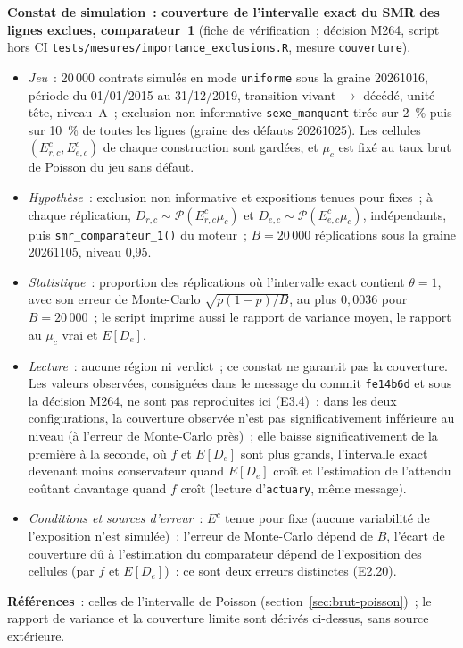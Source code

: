\documentclass[a4paper,11pt]{article}
\newcommand{\code}[1]{\texttt{\small #1}}
\begin{document}
{\medskip
\noindent
\textbf{Constat de simulation~: couverture de l'intervalle exact du SMR des
lignes exclues, comparateur~1} (fiche de vérification~; décision M264,
script hors CI \code{tests/mesures/importance\_exclusions.R}, mesure
\code{couverture}).
\begin{itemize}[leftmargin=*, itemsep=2pt]
  \item \emph{Jeu}~: 20\,000 contrats simulés en mode \code{uniforme} sous
    la graine 20261016, période du 01/01/2015 au 31/12/2019, transition
    vivant $\to$ décédé, unité tête, niveau~A~; exclusion non informative
    \code{sexe\_manquant} tirée sur 2~\% puis sur 10~\% de toutes les lignes
    (graine des défauts 20261025). Les cellules $(E^c_{r,c}, E^c_{e,c})$ de
    chaque construction sont gardées, et $\mu_c$ est fixé au taux brut de
    Poisson du jeu sans défaut.
  \item \emph{Hypothèse}~: exclusion non informative et expositions tenues
    pour fixes~; à chaque réplication, $D_{r,c} \sim
    \mathcal{P}(E^c_{r,c}\mu_c)$ et $D_{e,c} \sim
    \mathcal{P}(E^c_{e,c}\mu_c)$, indépendants, puis
    \code{smr\_comparateur\_1()} du moteur~; $B = 20\,000$ réplications sous
    la graine 20261105, niveau 0,95.
  \item \emph{Statistique}~: proportion des réplications où l'intervalle
    exact contient $\theta = 1$, avec son erreur de Monte-Carlo
    $\sqrt{p(1 - p)/B}$, au plus $0{,}0036$ pour $B = 20\,000$~; le script
    imprime aussi le rapport de variance moyen, le rapport au $\mu_c$ vrai
    et $E[D_e]$.
  \item \emph{Lecture}~: aucune région ni verdict~; ce constat ne garantit
    pas la couverture. Les valeurs observées, consignées dans le message du
    commit \code{fe14b6d} et sous la décision M264, ne sont pas reproduites
    ici (E3.4)~: dans les deux configurations, la couverture observée n'est
    pas significativement inférieure au niveau (à l'erreur de Monte-Carlo
    près)~; elle baisse significativement de la première à la seconde,
    où $f$ et $E[D_e]$ sont plus grands, l'intervalle exact devenant moins
    conservateur quand $E[D_e]$ croît et l'estimation de l'attendu coûtant
    davantage quand $f$ croît (lecture d'\code{actuary}, même message).
  \item \emph{Conditions et sources d'erreur}~: $E^c$ tenue pour fixe
    (aucune variabilité de l'exposition n'est simulée)~; l'erreur de
    Monte-Carlo dépend de $B$, l'écart de couverture dû à l'estimation du
    comparateur dépend de l'exposition des cellules (par $f$ et
    $E[D_e]$)~: ce sont deux erreurs distinctes (E2.20).
\end{itemize}

\noindent
\textbf{Références}~: celles de l'intervalle de Poisson
(section~\ref{sec:brut-poisson})~; le rapport de variance et la couverture
limite sont dérivés ci-dessus, sans source extérieure.\par}
\end{document}
